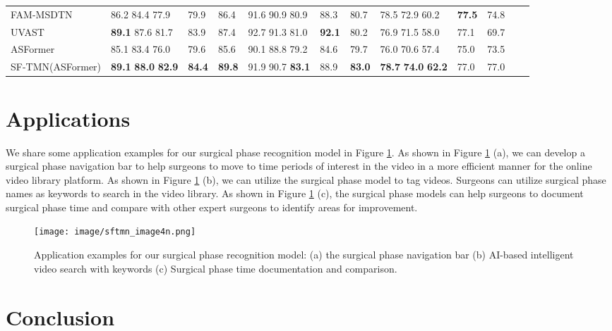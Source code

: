 \documentclass[sn-mathphys,Numbered]{sn-jnl}
\theoremstyle{thmstyleone}\newtheorem{theorem}{Theorem}\newtheorem{proposition}[theorem]{Proposition}
\theoremstyle{thmstyletwo}\newtheorem{example}{Example}\newtheorem{remark}{Remark}
\theoremstyle{thmstylethree}\newtheorem{definition}{Definition}
\begin{document}
\begin{table}[h]
\begin{tabular}{llllllllllll}
FAM-MSDTN \cite{du2022dilated} & 86.2 84.4 77.9 & 79.9 & 86.4 & 91.6 90.9 80.9 & 88.3 & 80.7 & 78.5 72.9 60.2 & \textbf{77.5} & 74.8\\
UVAST \cite{behrmann2022unified} & \textbf{89.1} 87.6 81.7 & 83.9 & 87.4 & 92.7 91.3 81.0 & \textbf{92.1} & 80.2 & 76.9 71.5 58.0 & 77.1 & 69.7\\
\hline
ASFormer \cite{yi2021asformer}& 85.1 83.4 76.0 & 79.6  & 85.6 & 90.1 88.8 79.2 & 84.6 & 79.7 & 76.0 70.6 57.4 & 75.0 & 73.5 \\
SF-TMN(ASFormer) & \textbf{89.1} \textbf{88.0} \textbf{82.9} & \textbf{84.4} & \textbf{89.8} & 91.9 90.7 \textbf{83.1} & 88.9 & \textbf{83.0} & \textbf{78.7} \textbf{74.0} \textbf{62.2} & 77.0 & 77.0\\
\hline
\end{tabular}

\end{table}

\section{Applications}

We share some application examples for our surgical phase recognition model in Figure \ref{fig5}. As shown in Figure \ref{fig5} (a), we can develop a surgical phase navigation bar to help surgeons to move to time periods of interest in the video in a more efficient manner for the online video library platform. As shown in Figure \ref{fig5} (b), we can utilize the surgical phase model to tag videos. Surgeons can utilize surgical phase names as keywords to search in the video library. As shown in Figure \ref{fig5} (c), the surgical phase models can help surgeons to document surgical phase time and compare with other expert surgeons to identify areas for improvement.

\begin{figure}[h]\centering
\texttt{[image: image/sftmn\_image4n.png]}
\caption{Application examples for our surgical phase recognition model: (a) the surgical phase navigation bar (b) AI-based intelligent video search with keywords (c) Surgical phase time documentation and comparison.}\label{fig5}
\end{figure}

\section{Conclusion}
\end{document}
